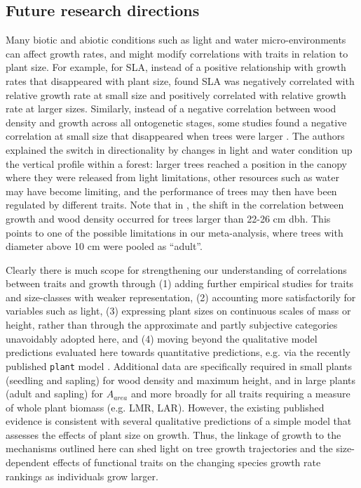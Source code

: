 \documentclass[a4paper,11pt]{article}
\begin{document}
\subsection*{Future research directions}

Many biotic and abiotic conditions such as light and water micro-environments can affect growth rates, and might modify correlations with traits in relation to plant size. For example, for SLA, instead of a positive relationship with growth rates that disappeared with plant size, \citet{Iida:2014ep} found SLA was negatively correlated with relative growth rate at small size and positively correlated with relative growth rate at larger sizes. Similarly, instead of a negative correlation between wood density and growth across all ontogenetic stages, some studies found a negative correlation at small size that disappeared when trees were larger \citep{Iida:2014ep,Iida:2014hq}. The authors explained the switch in directionality by changes in light and water condition up the vertical profile within a forest: larger trees reached a position in the canopy where they were released from light limitations, other resources such as water may have become limiting, and the performance of trees may then have been regulated by different traits. Note that in \citet{Iida:2014hq}, the shift in the correlation between growth and wood density occurred for trees larger than 22-26 cm dbh. This points to one of the possible limitations in our meta-analysis, where trees with diameter above 10 cm were pooled as ``adult''.

Clearly there is much scope for strengthening our understanding of correlations between traits and growth through (1) adding further empirical studies for traits and size-classes with weaker representation, (2) accounting more satisfactorily for variables such as light, (3) expressing plant sizes on continuous scales of mass or height, rather than through the approximate and partly subjective categories unavoidably adopted here, and (4) moving beyond the qualitative model predictions evaluated here towards quantitative predictions, e.g. via the recently published \texttt{plant} model \citep{Falster-2016}. Additional data are specifically required in small plants (seedling and sapling) for wood density and maximum height, and in large plants (adult and sapling) for $A_{area}$ and more broadly for all traits requiring a measure of whole plant biomass (e.g. LMR, LAR). However, the existing published evidence is consistent with several qualitative predictions of a simple model that assesses the effects of plant size on growth. Thus, the linkage of growth to the mechanisms outlined here can shed light on tree growth trajectories and the size-dependent effects of functional traits on the changing species growth rate rankings as individuals grow larger.
\end{document}
